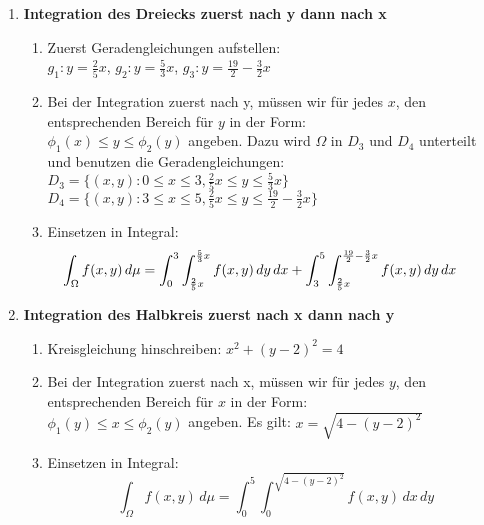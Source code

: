 \begin{enumerate}[leftmargin=0.5cm]
	\item \textbf{Integration des Dreiecks zuerst nach y dann nach x}
	\begin{enumerate}[leftmargin=0.3cm]
		\item Zuerst Geradengleichungen aufstellen:\\
		$g_1: y = \frac{2}{5}x$, $g_2: y = \frac{5}{3}x$, $g_3: y = \frac{19}{2} - \frac{3}{2}x$

		\item Bei der Integration zuerst nach y, müssen wir für jedes $x$, den entsprechenden Bereich für $y$ in der Form:\\
		$\phi_1(x) \leq y \leq \phi_2(y)$ angeben.
		Dazu wird $\Omega$ in $D_3$ und $D_4$ unterteilt und benutzen die Geradengleichungen:\\
		$D_3 = \{ (x, y): 0 \leq x \leq 3, \frac{2}{5}x \leq y \leq \frac{5}{3}x \}$\\
		$D_4 = \{ (x, y): 3 \leq x \leq 5, \frac{2}{5}x \leq y \leq \frac{19}{2} - \frac{3}{2}x \}$

		\item Einsetzen in Integral:
		\[\hspace{-0.8cm}\int_{\Omega} f(x, y) \, d\mu = 
		\int_0^3 \int_{\frac{2}{5}x}^{\frac{5}{3}x} f(x, y) \, dy \, dx +
		\int_3^5 \int_{\frac{2}{5}x}^{\frac{19}{2} - \frac{3}{2}x} f(x, y) \, dy \, dx\]
	\end{enumerate}

	\item \textbf{Integration des Halbkreis zuerst nach x dann nach y}
	\begin{enumerate}[leftmargin=0.3cm]
		\item Kreisgleichung hinschreiben: $x^2 + (y -2)^2 = 4$

		\item Bei der Integration zuerst nach x, müssen wir für jedes $y$, den entsprechenden Bereich für $x$ in der Form:\\
		$\phi_1(y) \leq x \leq \phi_2(y)$ angeben. Es gilt: $x = \sqrt{4 - (y-2)^2}$

		\item Einsetzen in Integral:
		\[\int_{\Omega} f(x, y) \, d\mu = \int_0^5 \int_0^{\sqrt{4 - (y-2)^2}} f(x, y) \, dx \, dy\]
	\end{enumerate}
\end{enumerate}


